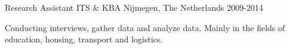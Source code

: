 \begin{cventries}
  \cventry
    {Research Assistant} %
    {ITS \& KBA} %
    {Nijmegen, The Netherlands} %
    {2009-2014} %
    {
      \begin{cvitems} %
        \item {Conducting interviews, gather data and analyze data. Mainly in the fields of education, housing, transport and logistics.}
      \end{cvitems}
    }


\end{cventries}
